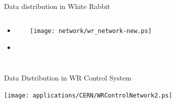 \documentclass[compress,red]{beamer}
\begin{document}
\subsection{}
\begin{frame}{Data distribution in White Rabbit}


\begin{columns}[c]
 
  \begin{itemize}
    \item \color{gray}{High accuracy/precision synchronization}
    \item \textbf{\color{red}{Deterministic, reliable and low-latency Control Data delivery}}
  \end{itemize}

    \begin{center}
    \texttt{[image: network/wr\_network-new.ps]}
    \end{center}
\end{columns}

\end{frame}
\begin{frame}{Data Distribution in WR Control System}

    \begin{center}
    \texttt{[image: applications/CERN/WRControlNetwork2.ps]}
    \end{center}


\end{frame}
\end{document}
